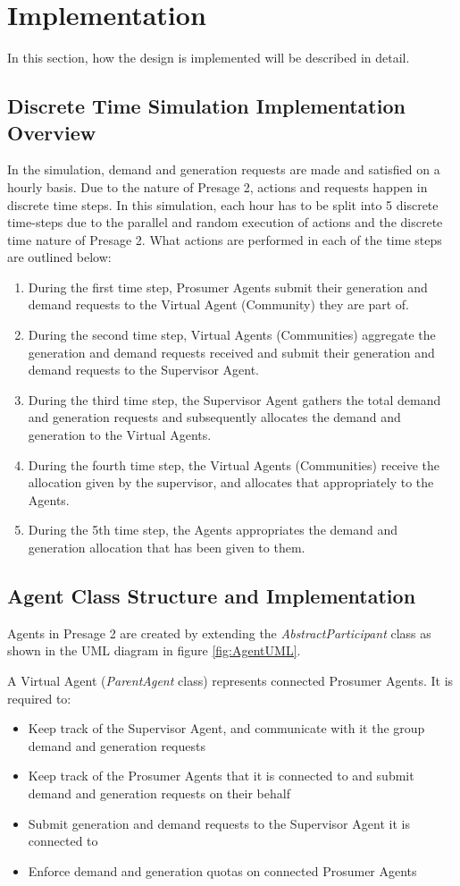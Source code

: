 \chapter{Implementation}
\label{Implementation}
In this section, how the design is implemented will be described in detail. 

\section*{Discrete Time Simulation Implementation Overview}
In the simulation, demand and generation requests are made and satisfied on a hourly basis. Due to the nature of Presage 2, actions and requests happen in discrete time steps. In this simulation, each hour has to be split into 5 discrete time-steps due to the parallel and random execution of actions and the discrete time nature of Presage 2. What actions are performed in each of the time steps are outlined below:
\begin{enumerate}
	\item During the first time step, Prosumer Agents submit their generation and demand requests to the Virtual Agent (Community) they are part of.
	\item During the second time step, Virtual Agents (Communities) aggregate the generation and demand requests received and submit their generation and demand requests to the Supervisor Agent.
	\item During the third time step, the Supervisor Agent gathers the total demand and generation requests and subsequently allocates the demand and generation to the Virtual Agents.
	\item During the fourth time step, the Virtual Agents (Communities) receive the allocation given by the supervisor, and allocates that appropriately to the Agents.
	\item During the 5th time step, the Agents appropriates the demand and generation allocation that has been given to them.
\end{enumerate}

\section*{Agent Class Structure and Implementation}
Agents in Presage 2 are created by extending the \textit{AbstractParticipant} class as shown in the \ac{UML} diagram in figure \ref{fig:AgentUML}. 

A Virtual Agent (\textit{ParentAgent} class) represents connected Prosumer Agents. It is required to:
\begin{itemize}
	\item Keep track of the Supervisor Agent, and communicate with it the group demand and generation requests
	\item Keep track of the Prosumer Agents that it is connected to and submit demand and generation requests on their behalf
	\item Submit generation and demand requests to the Supervisor Agent it is connected to
	\item Enforce demand and generation quotas on connected Prosumer Agents
\end{itemize}

